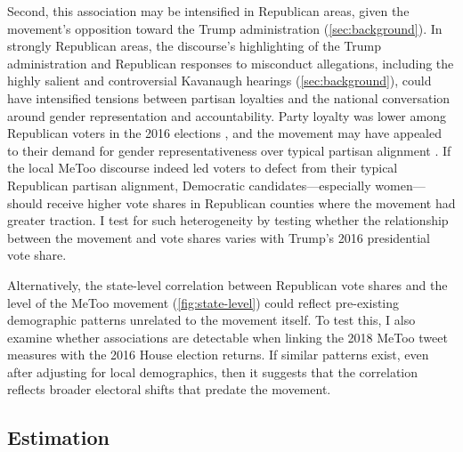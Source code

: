 \documentclass[manuscript,screen,nonacm,11pt,acm]{acmart}
\newcommand{\R}{Republican}
\begin{document}
Second, this association may be intensified in Republican areas, given the movement's opposition toward the Trump administration (\cref{sec:background}).
In strongly Republican areas, the discourse's highlighting of the Trump administration and Republican responses to misconduct allegations, including the highly salient and controversial Kavanaugh hearings (\cref{sec:background}), could have intensified tensions between partisan loyalties and the national conversation around gender representation and accountability.
Party loyalty was lower among Republican voters in the 2016 elections \citep{KeeterIgielnik2020}, and the movement may have appealed to their demand for gender representativeness over typical partisan alignment \citep{Lucas2021, CarsonHitefield2018, Gibson2019, dittmar2020, DeMora2023, brookings2019turnout2}.
If the local MeToo discourse indeed led voters to defect from their typical \R{} partisan alignment, Democratic candidates---especially women---should receive higher vote shares in Republican counties where the movement had greater traction.
I test for such heterogeneity by testing whether the relationship between the movement and vote shares varies with Trump's 2016 presidential vote share.

Alternatively, the state-level correlation between Republican vote shares and the level of the MeToo movement (\cref{fig:state-level}) could reflect pre-existing demographic patterns unrelated to the movement itself.
To test this, I also examine whether associations are detectable when linking the 2018 MeToo tweet measures with the 2016 House election returns.
If similar patterns exist, even after adjusting for local demographics, then it suggests that the correlation reflects broader electoral shifts that predate the movement.

\subsection{Estimation}
\label{sec:voteshare-estimation}
\end{document}
